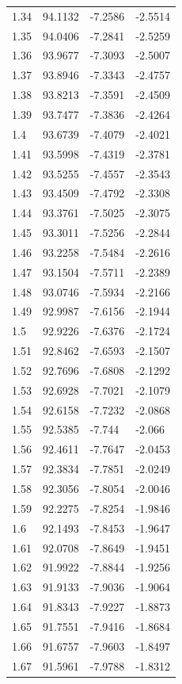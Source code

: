 \begin{tabular}{llll}
1.34 & 94.1132 & -7.2586 & -2.5514 \\
1.35 & 94.0406 & -7.2841 & -2.5259 \\
1.36 & 93.9677 & -7.3093 & -2.5007 \\
1.37 & 93.8946 & -7.3343 & -2.4757 \\
1.38 & 93.8213 & -7.3591 & -2.4509 \\
1.39 & 93.7477 & -7.3836 & -2.4264 \\
1.4 & 93.6739 & -7.4079 & -2.4021 \\
1.41 & 93.5998 & -7.4319 & -2.3781 \\
1.42 & 93.5255 & -7.4557 & -2.3543 \\
1.43 & 93.4509 & -7.4792 & -2.3308 \\
1.44 & 93.3761 & -7.5025 & -2.3075 \\
1.45 & 93.3011 & -7.5256 & -2.2844 \\
1.46 & 93.2258 & -7.5484 & -2.2616 \\
1.47 & 93.1504 & -7.5711 & -2.2389 \\
1.48 & 93.0746 & -7.5934 & -2.2166 \\
1.49 & 92.9987 & -7.6156 & -2.1944 \\
1.5 & 92.9226 & -7.6376 & -2.1724 \\
1.51 & 92.8462 & -7.6593 & -2.1507 \\
1.52 & 92.7696 & -7.6808 & -2.1292 \\
1.53 & 92.6928 & -7.7021 & -2.1079 \\
1.54 & 92.6158 & -7.7232 & -2.0868 \\
1.55 & 92.5385 & -7.744 & -2.066 \\
1.56 & 92.4611 & -7.7647 & -2.0453 \\
1.57 & 92.3834 & -7.7851 & -2.0249 \\
1.58 & 92.3056 & -7.8054 & -2.0046 \\
1.59 & 92.2275 & -7.8254 & -1.9846 \\
1.6 & 92.1493 & -7.8453 & -1.9647 \\
1.61 & 92.0708 & -7.8649 & -1.9451 \\
1.62 & 91.9922 & -7.8844 & -1.9256 \\
1.63 & 91.9133 & -7.9036 & -1.9064 \\
1.64 & 91.8343 & -7.9227 & -1.8873 \\
1.65 & 91.7551 & -7.9416 & -1.8684 \\
1.66 & 91.6757 & -7.9603 & -1.8497 \\
1.67 & 91.5961 & -7.9788 & -1.8312 \\

\end{tabular}
